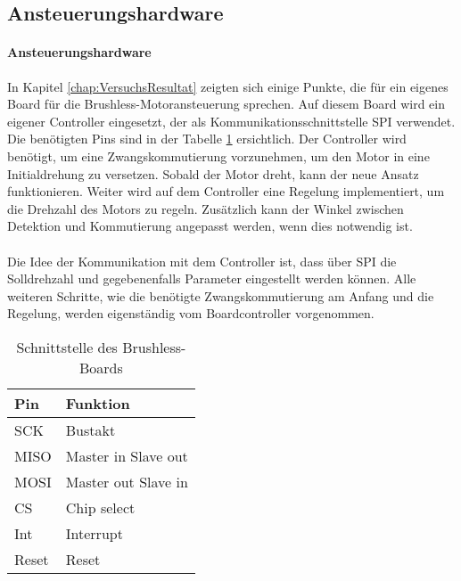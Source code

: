     \subsection{Ansteuerungshardware}
    \fi
    \ifEMBED
    \newpage
    \paragraph{Ansteuerungshardware}$~~$\vspace{2mm}\\
    \fi
        In Kapitel \ref{chap:VersuchsResultat} zeigten sich einige Punkte, die für ein eigenes Board 
        für die Brushless-Motoransteuerung sprechen. Auf diesem Board wird ein eigener Controller 
        eingesetzt, der als Kommunikationsschnittstelle SPI verwendet. Die benötigten Pins sind in 
        der Tabelle \ref{abb:SchnittstelleBrushlessBoard} ersichtlich. Der Controller wird benötigt, 
        um eine Zwangskommutierung vorzunehmen, um den Motor in eine Initialdrehung zu versetzen. 
        Sobald der Motor dreht, kann der neue Ansatz funktionieren. Weiter wird auf dem Controller eine 
        Regelung implementiert, um die Drehzahl des Motors zu regeln. Zusätzlich kann der Winkel 
        zwischen Detektion und Kommutierung angepasst werden, wenn dies notwendig ist.\\
        \\
        Die Idee der Kommunikation mit dem Controller ist, dass über SPI die Solldrehzahl und gegebenenfalls 
        Parameter eingestellt werden können. Alle weiteren Schritte, wie die benötigte Zwangskommutierung am 
        Anfang und die Regelung, werden eigenständig vom Boardcontroller vorgenommen.
        \begin{table}[h!]
            \begin{tabular}{ll}
                Pin     & Funktion \\
            \hline  SCK & Bustakt \\
                MISO    & Master in Slave out \\
                MOSI    & Master out Slave in \\
                CS      & Chip select \\
                Int     & Interrupt \\
                Reset   & Reset \\
            \end{tabular}
           	\centering
           	\caption{Schnittstelle des Brushless-Boards} 
            \label{abb:SchnittstelleBrushlessBoard}
        \end{table}
